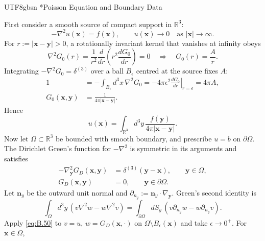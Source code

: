 \documentclass[11pt,a4paper,oneside]{report}
\makeatletter
\newcommand\topic{\@startsection{paragraph}{4}{\z@}{-1.7ex plus -.3ex}{.5ex}{\normalfont\normalsize\bfseries\itshape\boldmath}*}
\makeatother
\begin{document}
\begin{CJK*}{UTF8}{gbsn}
\topic{Poisson Equation and Boundary Data}

First consider a smooth source of compact support in $\mathbb R^3$:
\begin{equation*}
-\nabla^2u(\mathbf x)=f(\mathbf x),\qquad
u(\mathbf x)\to0\quad\text{as }|\mathbf x|\to\infty.
\tag{B.45}\label{eq:B.45}
\end{equation*}
For $r:=|\mathbf x-\mathbf y|>0$, a rotationally invariant kernel that vanishes at infinity obeys
\begin{equation*}
\nabla^2G_0(r)=\frac{1}{r^2}\frac{d}{dr}\left(r^2\frac{dG_0}{dr}\right)=0
\quad\Longrightarrow\quad G_0(r)=\frac{A}{r}.
\tag{B.46}\label{eq:B.46}
\end{equation*}
Integrating $-\nabla^2G_0=\delta^{(3)}$ over a ball $B_\epsilon$ centred at the source fixes $A$:
\begin{equation*}
\begin{aligned}
1&=-\int_{B_\epsilon}d^3x\,\nabla^2G_0
=-4\pi\epsilon^2\left.\frac{dG_0}{dr}\right|_{r=\epsilon}
=4\pi A,\\
G_0(\mathbf x,\mathbf y)&=\frac{1}{4\pi|\mathbf x-\mathbf y|}.
\end{aligned}
\tag{B.47}\label{eq:B.47}
\end{equation*}
Hence
\begin{equation*}
{\displaystyle u(\mathbf x)=\int_{\mathbb R^3}d^3y\,
\frac{f(\mathbf y)}{4\pi|\mathbf x-\mathbf y|}.}
\tag{B.48}\label{eq:B.48}
\end{equation*}
Now let $\Omega\subset\mathbb R^3$ be bounded with smooth boundary, and prescribe $u=b$ on $\partial\Omega$. The Dirichlet Green's function for $-\nabla^2$ is symmetric in its arguments and satisfies
\begin{equation*}
\begin{aligned}
-\nabla_{\mathbf y}^2G_D(\mathbf x,\mathbf y)
&=\delta^{(3)}(\mathbf y-\mathbf x),\qquad \mathbf y\in\Omega,\\
G_D(\mathbf x,\mathbf y)&=0,\qquad \mathbf y\in\partial\Omega.
\end{aligned}
\tag{B.49}\label{eq:B.49}
\end{equation*}
Let $\mathbf n_y$ be the outward unit normal and $\partial_{n_y}:=\mathbf n_y\cdot\nabla_{\mathbf y}$. Green's second identity is
\begin{equation*}
\int_\Omega d^3y\,(v\nabla^2w-w\nabla^2v)
=\int_{\partial\Omega}dS_y\,(v\partial_{n_y}w-w\partial_{n_y}v).
\tag{B.50}\label{eq:B.50}
\end{equation*}
Apply \eqref{eq:B.50} to $v=u$, $w=G_D(\mathbf x,\cdot)$ on $\Omega\setminus B_\epsilon(\mathbf x)$ and take $\epsilon\to0^+$. For $\mathbf x\in\Omega$,

\end{CJK*}
\end{document}
